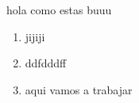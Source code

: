 \documentclass[12pt]{article}
\begin{document}
hola como estas buuu
\begin{enumerate}
    \item jijiji
    \item ddfdddff
    \item aqui vamos a trabajar 
    
\end{enumerate}
\end{document}
